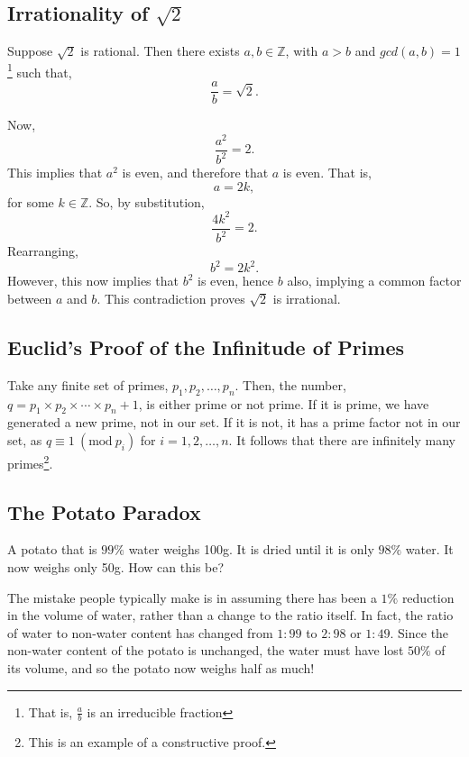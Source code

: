\documentclass[11pt]{amsart}
\begin{document}

\subsection{Irrationality of $\sqrt{2}$}

Suppose $\sqrt{2}$ is rational. Then there exists $a, b \in \mathbb{Z}$, with $a > b$ and $gcd(a, b) = 1$\footnote{That is, $\frac{a}{b}$ is an irreducible fraction} such that, $$\frac{a}{b} = \sqrt{2}.$$

Now, $$\frac{a^2}{b^2} = 2.$$ This implies that $a^2$ is even, and therefore that $a$ is even. That is, $$a = 2k,$$ for some $k \in \mathbb{Z}$. So, by substitution, $$\frac{4k^2}{b^2} = 2.$$ Rearranging, $$b^2 = 2k^2.$$ However, this now implies that $b^2$ is even, hence $b$ also, implying a common factor between $a$ and $b$. This contradiction proves $\sqrt{2}$ is irrational.

\subsection{Euclid's Proof of the Infinitude of Primes}

Take any finite set of primes, $p_1, p_2, \dots, p_n$. Then, the number, $q = p_1 \times p_2 \times \cdots \times p_n + 1$, is either prime or not prime. If it is prime, we have generated a new prime, not in our set. If it is not, it has a prime factor not in our set, as $q \equiv 1 \ (\text{mod}\ p_i)$ for $i = 1, 2, \dots, n$. It follows that there are infinitely many primes\footnote{This is an example of a constructive proof.}.

\subsection{The Potato Paradox}

A potato that is $99\%$ water weighs 100g. It is dried until it is only $98\%$ water. It now weighs only 50g. How can this be?

The mistake people typically make is in assuming there has been a $1\%$ reduction in the volume of water, rather than a change to the ratio itself. In fact, the ratio of water to non-water content has changed from $1:99$ to $2:98$ or $1:49$. Since the non-water content of the potato is unchanged, the water must have lost $50\%$ of its volume, and so the potato now weighs half as much!
\end{document}
